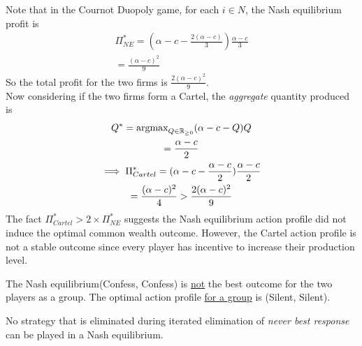 \documentclass[11pt]{article}
\begin{document}
		\begin{example}
			Note that in the Cournot Duopoly game, for each $i \in N$, the Nash equilibrium profit is
			\begin{gather}
				\Pi_{NE}^* = (\alpha - c - \frac{2(\alpha - c)}{3}) \frac{\alpha - c}{3} \\
				= \frac{(\alpha - c)^2}{9}
			\end{gather}
			So the total profit for the two firms is $\frac{2(\alpha - c)^2}{9}$. \\
			Now considering if the two firms form a Cartel, the \emph{aggregate} quantity produced is
			\begin{gather}
				Q^* = \text{{argmax}}_{Q \in \mathbb{R}_{\geq 0}} (\alpha - c - Q) Q \\
				= \frac{\alpha - c}{2} \\
				\implies \Pi_{Cartel}^* = (\alpha - c - \frac{\alpha - c}{2}) \frac{\alpha - c}{2} \\
				= \frac{(\alpha - c)^2}{4} > \frac{2(\alpha - c)^2}{9}
			\end{gather}
			The fact $\Pi_{Cartel}^* > 2 \times \Pi_{NE}^*$ suggests the Nash equilibrium action profile did not induce the optimal common wealth outcome. However, the Cartel action profile is not a stable outcome since every player has incentive to increase their production level.
		\end{example}
		
		\begin{example}
			The Nash equilibrium(Confess, Confess) is \ul{not} the best outcome for the two players as a group. The optimal action profile \ul{for a group} is (Silent, Silent).
		\end{example}
		
		\begin{proposition}
			No strategy that is eliminated during iterated elimination of \emph{never best response} can be played in a Nash equilibrium.
		\end{proposition}
	
\end{document}
